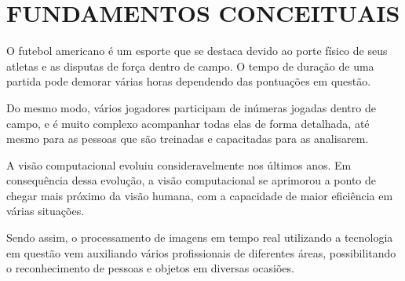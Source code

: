 \chapter{FUNDAMENTOS CONCEITUAIS}

O futebol americano é um esporte que se destaca devido ao porte físico de seus atletas e as disputas de força dentro de campo. O tempo de duração de uma partida pode demorar várias horas dependendo das pontuações em questão.

Do mesmo modo, vários jogadores participam de inúmeras jogadas dentro de campo, e é muito complexo acompanhar todas elas de forma detalhada, até mesmo para as pessoas que são treinadas e capacitadas para as analisarem.

A visão computacional evoluiu consideravelmente nos últimos anos. Em consequência dessa evolução, a visão computacional se aprimorou a ponto de chegar mais próximo da visão humana, com a capacidade de maior eficiência em várias situações.

Sendo assim, o processamento de imagens em tempo real utilizando a tecnologia em questão vem auxiliando vários profissionais de diferentes áreas, possibilitando o reconhecimento de pessoas e objetos em diversas ocasiões.













%
%